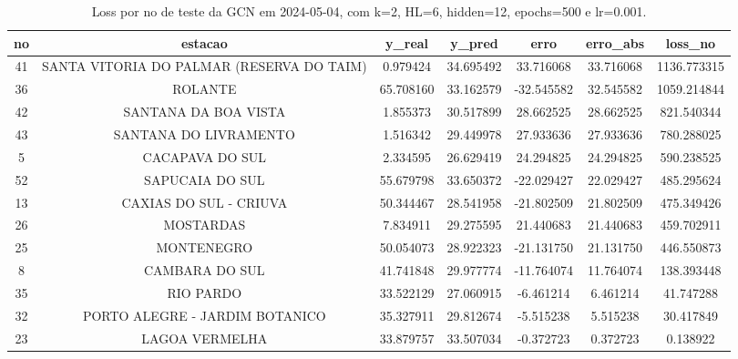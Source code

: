 \begin{table}[h]
\centering
\caption{Loss por no de teste da GCN em 2024-05-04, com k=2, HL=6, hidden=12, epochs=500 e lr=0.001.}
\label{tab:gcn_loss_k2_hl6_h12_e500_d20240504}
\begin{tabular}{ccccccc}
\toprule
no & estacao & y\_real & y\_pred & erro & erro\_abs & loss\_no \\
\midrule
41 & SANTA VITORIA DO PALMAR (RESERVA DO TAIM) & 0.979424 & 34.695492 & 33.716068 & 33.716068 & 1136.773315 \\
36 & ROLANTE & 65.708160 & 33.162579 & -32.545582 & 32.545582 & 1059.214844 \\
42 & SANTANA DA BOA VISTA & 1.855373 & 30.517899 & 28.662525 & 28.662525 & 821.540344 \\
43 & SANTANA DO LIVRAMENTO & 1.516342 & 29.449978 & 27.933636 & 27.933636 & 780.288025 \\
5 & CACAPAVA DO SUL & 2.334595 & 26.629419 & 24.294825 & 24.294825 & 590.238525 \\
52 & SAPUCAIA DO SUL & 55.679798 & 33.650372 & -22.029427 & 22.029427 & 485.295624 \\
13 & CAXIAS DO SUL - CRIUVA & 50.344467 & 28.541958 & -21.802509 & 21.802509 & 475.349426 \\
26 & MOSTARDAS & 7.834911 & 29.275595 & 21.440683 & 21.440683 & 459.702911 \\
25 & MONTENEGRO & 50.054073 & 28.922323 & -21.131750 & 21.131750 & 446.550873 \\
8 & CAMBARA DO SUL & 41.741848 & 29.977774 & -11.764074 & 11.764074 & 138.393448 \\
35 & RIO PARDO & 33.522129 & 27.060915 & -6.461214 & 6.461214 & 41.747288 \\
32 & PORTO ALEGRE - JARDIM BOTANICO & 35.327911 & 29.812674 & -5.515238 & 5.515238 & 30.417849 \\
23 & LAGOA VERMELHA & 33.879757 & 33.507034 & -0.372723 & 0.372723 & 0.138922 \\
\bottomrule
\end{tabular}
\end{table}
